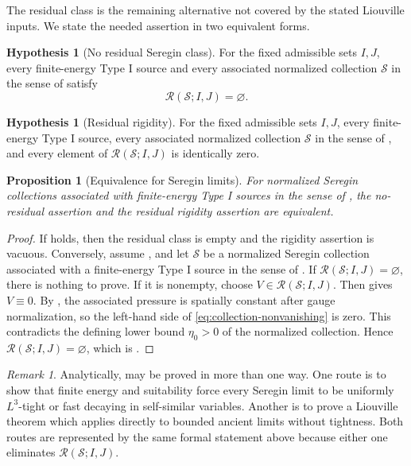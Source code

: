 \documentclass[11pt]{amsart}
\theoremstyle{plain}
\newtheorem{proposition}[theorem]{Proposition}
\theoremstyle{definition}
\newtheorem{hypothesis}[theorem]{Hypothesis}
\theoremstyle{remark}
\newtheorem{remark}[theorem]{Remark}
\numberwithin{equation}{section}
\begin{document}
The residual class is the remaining alternative not covered by the stated
Liouville inputs.  We state the needed assertion in two equivalent forms.

\begin{hypothesis}[No residual Seregin class]\label{hyp:no-residual}
For the fixed admissible sets \(I,J\), every finite-energy Type I source and
every associated normalized collection \(\mathcal S\) in the sense of
 satisfy
\[
   \mathcal R(\mathcal S;I,J)=\varnothing .
\]
\end{hypothesis}

\begin{hypothesis}[Residual rigidity]\label{hyp:residual-rigidity}
For the fixed admissible sets \(I,J\), every finite-energy Type I source,
every associated normalized collection \(\mathcal S\) in the sense of
, and every element of
\(\mathcal R(\mathcal S;I,J)\) is identically zero.
\end{hypothesis}

\begin{proposition}[Equivalence for Seregin limits]\label{prop:residual-equivalence}
For normalized Seregin collections associated with finite-energy Type I
sources in the sense of , the no-residual
assertion  and the residual rigidity assertion
 are equivalent.
\end{proposition}

\begin{proof}
If  holds, then the residual class is empty and the
rigidity assertion is vacuous.  Conversely, assume
, and let \(\mathcal S\) be a normalized Seregin
collection associated with a finite-energy Type I source in the sense of
.  If
\(\mathcal R(\mathcal S;I,J)=\varnothing\), there is nothing to prove.  If it
is nonempty, choose \(V\in\mathcal R(\mathcal S;I,J)\).  Then
 gives \(V\equiv0\).  By ,
the associated pressure is spatially constant after gauge normalization, so
the left-hand side of \eqref{eq:collection-nonvanishing} is zero.  This
contradicts the defining lower bound
\(\eta_0>0\) of the normalized collection.  Hence
\(\mathcal R(\mathcal S;I,J)=\varnothing\), which is
.
\end{proof}

\begin{remark}\label{rem:meaning-residual}
Analytically,  may be proved in more than one way.  One
route is to show that finite energy and suitability force every Seregin limit
to be uniformly \(L^3\)-tight or fast decaying in self-similar variables.
Another is to prove a Liouville theorem which applies directly to bounded
ancient limits without tightness.  Both routes are represented by the same
formal statement above because either one eliminates
\(\mathcal R(\mathcal S;I,J)\).
\end{remark}
\end{document}
